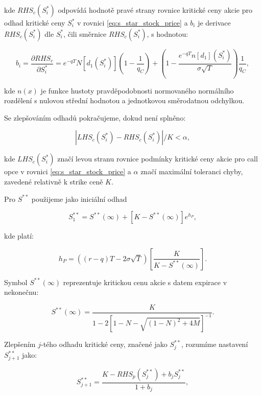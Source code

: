 \documentclass[male,czech,api_bc]{kitheses}
\begin{document}
  kde $RHS_c(S^*_i)$ odpovídá hodnotě pravé strany rovnice kritické ceny akcie pro odhad kritické ceny $S^*_i$ v rovnici \eqref{eq:s_star_stock_price} a $b_i$ je derivace $RHS_c(S^*_i)$ dle $S^*_i$, čili směrnice $RHS_c(S^*_i)$, s hodnotou:

  \begin{equation}
    b_i = \frac{\partial RHS_c}{\partial S^*_i} = e^{-qT} N[d_1(S^*_i)](1 - \frac{1}{q_C}) + \left( 1 - \frac{e^{-qT}n[d_1](S^*_i)}{\sigma \sqrt{T}} \right) \frac{1}{q_C},
  \end{equation}

  kde $n(x)$ je funkce hustoty pravděpodobnosti normovaného normálního rozdělení s nulovou střední hodnotou a jednotkovou směrodatnou odchylkou. 

  Se zlepšováním odhadů pokračujeme, dokud není splněno:

  \begin{equation}
    |LHS_c(S^*_i) - RHS_c(S^*_i)| / K < \alpha,
  \end{equation}

  kde $LHS_c(S^*_i)$ značí levou stranu rovnice podmínky kritické ceny akcie pro call opce v rovnici \eqref{eq:s_star_stock_price} a $\alpha$ značí maximální toleranci chyby, zavedené relativně k strike ceně $K$.

  Pro $S^{**}$ použijeme jako iniciální odhad

  \begin{equation}
    S_1^{**} = S^{**}(\infty) + [K - S^{**}(\infty)]e^{h_P},
  \end{equation}

  kde platí:

  \begin{equation}
    h_P = ((r-q)T - 2 \sigma \sqrt{T}) \left[ \frac{K}{K - S^{**}(\infty)} \right].
  \end{equation}

  Symbol $S^{**}(\infty)$ reprezentuje kritickou cenu akcie s datem expirace v nekonečnu:

  \begin{equation}
    S^{**}(\infty) = \frac{K}{1 - 2 [1 - N - \sqrt{(1 - N)^2 + 4M}]^{-1}}.
  \end{equation}

  Zlepšením $j$-tého odhadu kritické ceny, značené jako $S^{**}_j$, rozumíme nastavení $S^{**}_{j+1}$ jako:

  \begin{equation}
    S^{**}_{j+1} = \frac{K - RHS_p(S^{**}_j) + b_j S^{**}_j}{1 + b_j},
  \end{equation}
\end{document}
